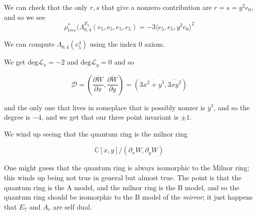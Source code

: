 \documentclass{amsart}
\theoremstyle{definition}
\newcommand{\C}{\mathbb{C}}
\begin{document}
We can check that the only $r,s$ that give a nonzero contribution are $r=s=y^2e_0$, and so we see
$$\rho_{tree}^*(\Lambda_{0,4}^{E_7}(e_5,e_5,e_5,e_5)=-3\langle e_5,e_5,y^2e_0\rangle^2$$

We can compute $\Lambda_{0,4}(e_5^4)$ using the index $0$ axiom.

We get $\text{deg}\mathcal{L}_x=-2$ and $\text{deg}\mathcal{L}_y=0$
and so 

$$\mathcal{D}=(\frac{\overline{\partial W}}{\partial x},\frac{\overline{\partial W}}{\partial y})=(\overline{3x^2+y^3},\overline{3xy^2})$$

and the only one that lives in someplace that is possibly nonzer is $\overline{y}^3$, and so the degree is $-4$, and we get that our three point invariant is $\pm 1$.

We wind up seeing that the quantum ring is the milnor ring

$$\C[x,y]/(\partial_x W, \partial_y W)$$

One might guess that the quantum ring is always isomorphic to the Milnor ring; this winds up being not true in general but almost true.  The point is that the quantum ring is the A model, and the milnor ring is the B model, and so the quantum ring should be isomorphic to the B model of the \emph{mirror}; it just happens that $E_7$ and $A_r$ are self dual.
\end{document}
